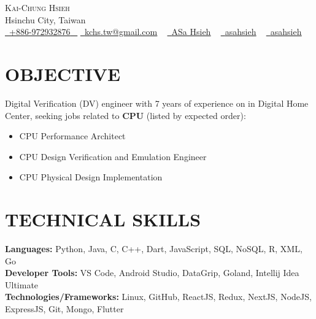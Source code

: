 \documentclass[letterpaper,11pt]{article}
\newcommand{\resumeItem}[1]{
  \item\small{
    {#1 \vspace{-0.5pt}}
  }
}
\newcommand{\resumeItemListStart}{\begin{itemize}}
\newcommand{\resumeItemListEnd}{\end{itemize}\vspace{-5pt}}
\begin{document}


\begin{center}
    {\Huge \scshape Kai-Chung Hsieh} \\ \vspace{1pt}
    Hsinchu City, Taiwan \\ \vspace{1pt}
    \small \href{tel:+886972932876}{ \raisebox{-0.1\height}\faPhone\ \underline{+886-972932876} ~} \href{mailto:kchs.tw@gmail.com}{\raisebox{-0.2\height}\faGoogle\  \underline{kchs.tw@gmail.com}} ~ 
    \href{https://linkedin.com/in/asa-hsieh}{\raisebox{-0.2\height}\faLinkedinSquare\ \underline{ASa Hsieh}}  ~
    \href{https://github.com/asahsieh}{\raisebox{-0.2\height}\faGithub\ \underline{asahsieh}} ~
    \href{https://hackmd.io/@asahsieh}{\raisebox{-0.2\height}\faBook\ \underline{asahsieh}} ~
    \vspace{-8pt}
\end{center}
 

\section{OBJECTIVE}
    {Digital Verification (DV) engineer with 7 years of experience on in Digital Home Center, seeking jobs related to \textbf{CPU} (listed by expected order):}
        \resumeItemListStart
            \resumeItem{\normalsize{CPU Performance Architect \href{https://careers.google.com/jobs/results/106694213048902342/}{\raisebox{-0.1\height}\faExternalLink }}}
            \vspace{-5pt}
            \resumeItem{\normalsize{CPU Design Verification and Emulation Engineer \href{https://careers.google.com/jobs/results/103455667181757126/}{\raisebox{-0.1\height}\faExternalLink }}}
             \vspace{-5pt}
            \resumeItem{\normalsize{CPU Physical Design Implementation \href{https://careers.google.com/jobs/results/90401417669288646/}{\raisebox{-0.1\height}\faExternalLink }}}
        \resumeItemListEnd
    \vspace{-6pt}
     

\section{TECHNICAL SKILLS}
 \begin{itemize}[leftmargin=0.15in, label={}]
    \small{\item{
     \textbf{\normalsize{Languages:}}{ \normalsize{Python, Java, C, C++, Dart, JavaScript, SQL, NoSQL, R, XML, Go}} \\
     \textbf{\normalsize{Developer Tools:}}{ \normalsize{VS Code, Android Studio, DataGrip, Goland, Intellij Idea Ultimate}} \\
     \textbf{\normalsize{Technologies/Frameworks:}}{\normalsize{ Linux, GitHub, ReactJS, Redux, NextJS, NodeJS, ExpressJS, Git, Mongo, Flutter}} \\
    }}
 \end{itemize}
 \vspace{-15pt}
 
\end{document}
